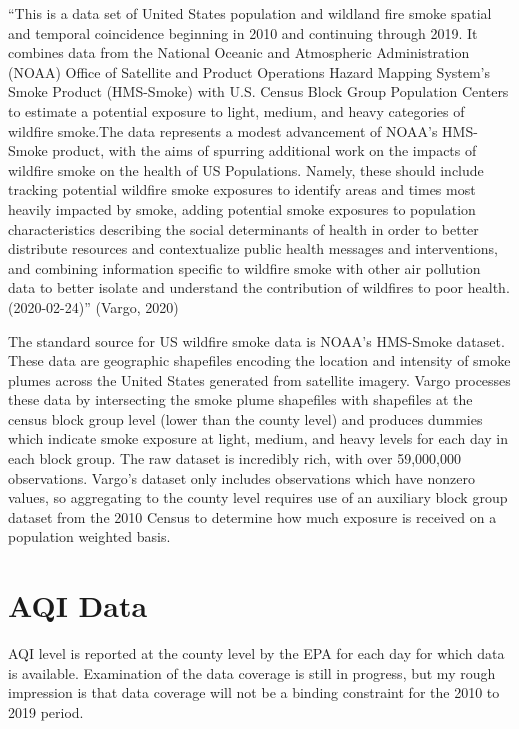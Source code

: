 \documentclass[]{article}
\begin{document}
``This is a data set of United States population and wildland fire smoke
spatial and temporal coincidence beginning in 2010 and continuing
through 2019. It combines data from the National Oceanic and Atmospheric
Administration (NOAA) Office of Satellite and Product Operations Hazard
Mapping System's Smoke Product (HMS-Smoke) with U.S. Census Block Group
Population Centers to estimate a potential exposure to light, medium,
and heavy categories of wildfire smoke.The data represents a modest
advancement of NOAA's HMS-Smoke product, with the aims of spurring
additional work on the impacts of wildfire smoke on the health of US
Populations. Namely, these should include tracking potential wildfire
smoke exposures to identify areas and times most heavily impacted by
smoke, adding potential smoke exposures to population characteristics
describing the social determinants of health in order to better
distribute resources and contextualize public health messages and
interventions, and combining information specific to wildfire smoke with
other air pollution data to better isolate and understand the
contribution of wildfires to poor health. (2020-02-24)'' (Vargo, 2020)

The standard source for US wildfire smoke data is NOAA's HMS-Smoke
dataset. These data are geographic shapefiles encoding the location and
intensity of smoke plumes across the United States generated from
satellite imagery. Vargo processes these data by intersecting the smoke
plume shapefiles with shapefiles at the census block group level (lower
than the county level) and produces dummies which indicate smoke
exposure at light, medium, and heavy levels for each day in each block
group. The raw dataset is incredibly rich, with over 59,000,000
observations. Vargo's dataset only includes observations which have
nonzero values, so aggregating to the county level requires use of an
auxiliary block group dataset from the 2010 Census to determine how much
exposure is received on a population weighted basis.

\section{AQI Data}\label{aqi-data}

AQI level is reported at the county level by the EPA for each day for
which data is available. Examination of the data coverage is still in
progress, but my rough impression is that data coverage will not be a
binding constraint for the 2010 to 2019 period.
\end{document}
